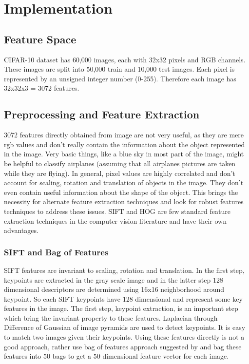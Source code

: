 \documentclass[12pt]{article}
\begin{document}
\section{Implementation}
\subsection{Feature Space}\label{sec:feature_space}
CIFAR-10 dataset has 60,000 images, each with 32x32 pixels and RGB channels. These images are split into 50,000 train and 10,000 test images. Each pixel is represented by an unsigned integer number (0-255). Therefore each image has 32x32x3 = 3072 features. 
\subsection{Preprocessing and Feature Extraction}
3072 features directly obtained from image are not very useful, as they are mere rgb values and don't really contain the information about the object represented in the image. Very basic things, like a blue sky in most part of the image, might be helpful to classify airplanes (assuming that all airplanes pictures are taken while they are flying). In general, pixel values are highly correlated and don't account for scaling, rotation and translation of objects in the image. They don't even contain useful information about the shape of the object. This brings the necessity for alternate feature extraction techniques and look for robust features techniques to address these issues. SIFT and HOG are few standard feature extraction techniques in the computer vision literature and have their own advantages.
\subsubsection*{SIFT and Bag of Features}
SIFT\cite{ref:sift} features are invariant to scaling, rotation and translation. In the first step, keypoints are extracted in the gray scale image and in the latter step 128 dimensional descriptors are determined using 16x16 neighborhood around keypoint. So each SIFT keypoints have 128 dimensional and represent some key features in the image. The first step, keypoint extraction, is an important step which bring the invariant property to these features. Laplacian through Difference of Gaussian of image pyramids are used to detect keypoints. It is easy to match two images given their keypoints. Using these features directly is not a good approach, rather use bag of features approach suggested by \citet{ref:bof} and bag these features into 50 bags to get a 50 dimensional feature vector for each image.
\end{document}
